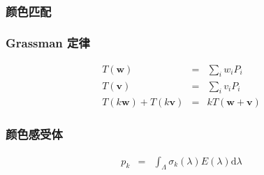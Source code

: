 \documentclass{beamer}
\newcommand{\mathd}{\mathrm{d}}
\newcommand{\nospace}{}
\newcommand{\tmmathbf}[1]{\ensuremath{\boldsymbol{#1}}}
\begin{document}
{{\begin{frame}
  \quad{}
  
  \ 
\end{frame}}{\begin{frame}
  \frametitle{颜色匹配}
  
  \quad{}
\end{frame}}{\begin{frame}
  \frametitle{Grassman 定律}
  \begin{eqnarray*}
    T (\tmmathbf{w}) & = & \sum_i w_i P_i\\
    T (\tmmathbf{v}) & = & \sum_i v_i P_i\\
    T (k\tmmathbf{w}) + T (k\tmmathbf{v}) & = & k \nospace T
    (\tmmathbf{w}+\tmmathbf{v})
  \end{eqnarray*}
\end{frame}}{\begin{frame}
  \frametitle{颜色感受体}
  \begin{eqnarray*}
    p_k & = & \int_{\Lambda} \sigma_k (\lambda) E (\lambda) \mathd \lambda
  \end{eqnarray*}
  

\end{frame}}}
\end{document}
